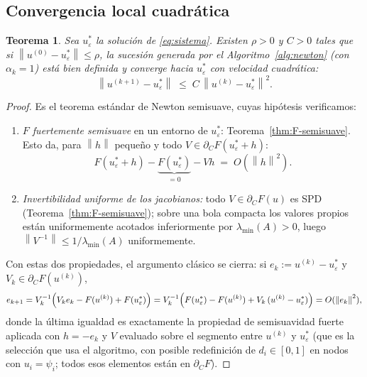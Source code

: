 \documentclass[11pt,a4paper]{article}
\newtheorem{teorema}{Teorema}[section]
\theoremstyle{definition}
\theoremstyle{remark}
\newcommand{\Norm}[1]{\left\lVert #1 \right\rVert}
\begin{document}
\begin{observación}
\begin{observación}
\subsection{Convergencia local cuadrática}

\begin{teorema}\label{thm:newton-conv}
Sea $u^\ast_\varepsilon$ la solución de \eqref{eq:sistema}. Existen
$\rho > 0$ y $C > 0$ tales que si $\Norm{u^{(0)} - u^\ast_\varepsilon}
\le \rho$, la sucesión generada por el Algoritmo~\ref{alg:newton}
(con $\alpha_k = 1$) está bien definida y converge hacia
$u^\ast_\varepsilon$ con velocidad cuadrática:
\[
\Norm{u^{(k+1)} - u^\ast_\varepsilon}
\;\le\; C\,\Norm{u^{(k)} - u^\ast_\varepsilon}^2 .
\]
\end{teorema}

\begin{proof}
Es el teorema estándar de Newton semisuave, cuyas hipótesis verificamos:
\begin{enumerate}
\item \emph{$F$ fuertemente semisuave} en un entorno de
$u^\ast_\varepsilon$: Teorema~\ref{thm:F-semisuave}. Esto da, para
$\Norm{h}$ pequeño y todo $V \in \partial_C F(u^\ast_\varepsilon + h)$:
\[
F(u^\ast_\varepsilon + h) - \underbrace{F(u^\ast_\varepsilon)}_{=0}
- V h \;=\; O(\Norm{h}^2).
\]
\item \emph{Invertibilidad uniforme de los jacobianos:} todo
$V \in \partial_C F(u)$ es SPD
(Teorema~\ref{thm:F-semisuave}); sobre una bola compacta los valores
propios están uniformemente acotados inferiormente por $\lambda_{\min}(A) > 0$,
luego $\Norm{V^{-1}} \le 1/\lambda_{\min}(A)$ uniformemente.
\end{enumerate}
Con estas dos propiedades, el argumento clásico se cierra: si
$e_k := u^{(k)} - u^\ast_\varepsilon$ y $V_k \in \partial_C
F(u^{(k)})$,
\[
e_{k+1}
= V_k^{-1}\Bigl(V_k e_k - F(u^{(k)}) + F(u^\ast_\varepsilon)\Bigr)
= V_k^{-1}\Bigl(F(u^\ast_\varepsilon) - F(u^{(k)}) + V_k\,(u^{(k)} - u^\ast_\varepsilon)\Bigr)
= O(\Norm{e_k}^2),
\]
donde la última igualdad es exactamente la propiedad de semisuavidad fuerte
aplicada con $h = -e_k$ y $V$ evaluado sobre el segmento entre
$u^{(k)}$ y $u^\ast_\varepsilon$ (que es la selección que usa el
algoritmo, con posible redefinición de $d_i \in [0,1]$ en nodos con
$u_i = \psi_i$; todos esos elementos están en $\partial_C F$).
\end{proof}


\end{observación}
\end{observación}
\end{document}
